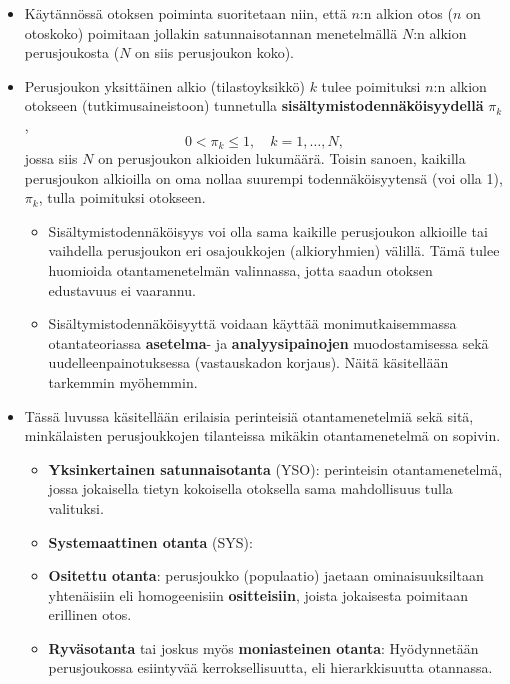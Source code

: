 \documentclass[
]{book}
\providecommand{\tightlist}{%
  \setlength{\itemsep}{0pt}\setlength{\parskip}{0pt}}
\begin{document}
\begin{itemize}
\tightlist
\item
  Käytännössä otoksen poiminta suoritetaan niin, että \(n\):n alkion otos (\(n\) on otoskoko) poimitaan jollakin satunnaisotannan menetelmällä \(N\):n alkion perusjoukosta (\(N\) on siis perusjoukon koko).
\item
  Perusjoukon yksittäinen alkio (tilastoyksikkö) \(k\) tulee poimituksi \(n\):n alkion otokseen (tutkimusaineistoon) tunnetulla \textbf{sisältymistodennäköisyydellä} \(\pi_k\),
  \[
  0 < \pi_k \le 1, \quad k = 1, \ldots, N,
  \]
  jossa siis \(N\) on perusjoukon alkioiden lukumäärä. Toisin sanoen, kaikilla perusjoukon alkioilla on oma nollaa suurempi todennäköisyytensä (voi olla 1), \(\pi_k\), tulla poimituksi otokseen.

  \begin{itemize}
  \tightlist
  \item
    Sisältymistodennäköisyys voi olla sama kaikille perusjoukon alkioille tai vaihdella perusjoukon eri osajoukkojen (alkioryhmien) välillä. Tämä tulee huomioida otantamenetelmän valinnassa, jotta saadun otoksen edustavuus ei vaarannu.
  \item
    Sisältymistodennäköisyyttä voidaan käyttää monimutkaisemmassa otantateoriassa \textbf{asetelma}- ja \textbf{analyysipainojen} muodostamisessa sekä uudelleenpainotuksessa (vastauskadon korjaus). Näitä käsitellään tarkemmin myöhemmin.
  \end{itemize}
\item
  Tässä luvussa käsitellään erilaisia perinteisiä otantamenetelmiä sekä sitä, minkälaisten perusjoukkojen tilanteissa mikäkin otantamenetelmä on sopivin.

  \begin{itemize}
  \tightlist
  \item
    \textbf{Yksinkertainen satunnaisotanta} (YSO): perinteisin otantamenetelmä, jossa jokaisella tietyn kokoisella otoksella sama mahdollisuus tulla valituksi.
  \item
    \textbf{Systemaattinen otanta} (SYS):
  \item
    \textbf{Ositettu otanta}: perusjoukko (populaatio) jaetaan ominaisuuksiltaan yhtenäisiin eli homogeenisiin \textbf{ositteisiin}, joista jokaisesta poimitaan erillinen otos.
  \item
    \textbf{Ryväsotanta} tai joskus myös \textbf{moniasteinen otanta}: Hyödynnetään perusjoukossa esiintyvää kerroksellisuutta, eli hierarkkisuutta otannassa.
  \end{itemize}
\end{itemize}
\end{document}

